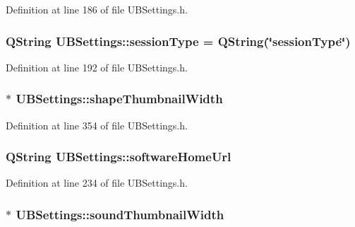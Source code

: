 Definition at line 186 of file U\-B\-Settings.\-h.

\hypertarget{class_u_b_settings_ad3493cc837846b1736c44fc02658420f}{
\subsubsection[{session\-Type}]{\setlength{\rightskip}{0pt plus 5cm}Q\-String U\-B\-Settings\-::session\-Type = Q\-String(\char`\"{}session\-Type\char`\"{})\hspace{0.3cm}{\ttfamily [static]}}}\label{db/d66/class_u_b_settings_ad3493cc837846b1736c44fc02658420f}


Definition at line 192 of file U\-B\-Settings.\-h.

\hypertarget{class_u_b_settings_a775f91fb0a35180d4df55234201e431d}{
\subsubsection[{shape\-Thumbnail\-Width}]{$\ast$ U\-B\-Settings\-::shape\-Thumbnail\-Width}}\label{db/d66/class_u_b_settings_a775f91fb0a35180d4df55234201e431d}


Definition at line 354 of file U\-B\-Settings.\-h.

\hypertarget{class_u_b_settings_abedefc35ccda3678f75ccfdd15d96782}{
\subsubsection[{software\-Home\-Url}]{\setlength{\rightskip}{0pt plus 5cm}Q\-String U\-B\-Settings\-::software\-Home\-Url}}\label{db/d66/class_u_b_settings_abedefc35ccda3678f75ccfdd15d96782}


Definition at line 234 of file U\-B\-Settings.\-h.

\hypertarget{class_u_b_settings_a9c592dd313b4b929821f21f310342fdc}{
\subsubsection[{sound\-Thumbnail\-Width}]{$\ast$ U\-B\-Settings\-::sound\-Thumbnail\-Width}}\label{db/d66/class_u_b_settings_a9c592dd313b4b929821f21f310342fdc}


